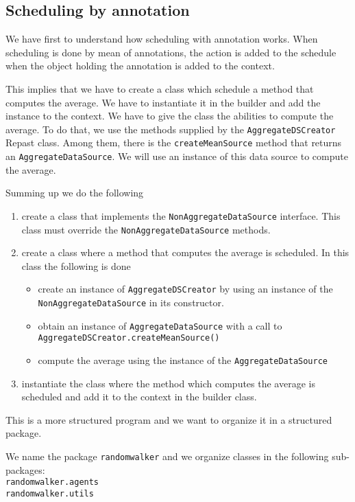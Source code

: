 \documentclass{article}
\begin{document}
\subsection{Scheduling by annotation}

We have first to understand how scheduling with annotation works.
When scheduling is done by mean of annotations, the action is added to the schedule when the object holding the annotation is added to the context. 

This implies that we have to create a class which schedule a method that computes the average. We have to instantiate it in the builder and add the instance to the context. We have to give the class the abilities to compute the average. To do that, we use the methods supplied by the \verb+AggregateDSCreator+ Repast class. Among them,  there is the \verb+createMeanSource+ method that returns an \verb+AggregateDataSource+. We will use an instance of this data source to compute the average.

Summing up we do the following
\begin{enumerate}
	\item create a class that implements the \verb+NonAggregateDataSource+ interface. This class must override the \verb+NonAggregateDataSource+ methods.
	\item create a class where a method that computes the average is scheduled. In this class the following is done
		\begin{itemize}
			\item create an instance of \verb+AggregateDSCreator+ by using an instance of the \verb+NonAggregateDataSource+ in its constructor.
			\item obtain an instance of \verb+AggregateDataSource+ with a call to\\ \verb+AggregateDSCreator.createMeanSource()+
			\item compute the average using the instance of the \verb+AggregateDataSource+
		\end{itemize}
	\item instantiate the class where the method which computes the average is scheduled and add it to the context in the builder class.
\end{enumerate}

This is a more structured program and we want to organize it in a structured package.

We name the package \verb+randomwalker+ and we organize classes in the following sub-packages:\\
\verb+randomwalker.agents+\\
\verb+randomwalker.utils+
\end{document}

